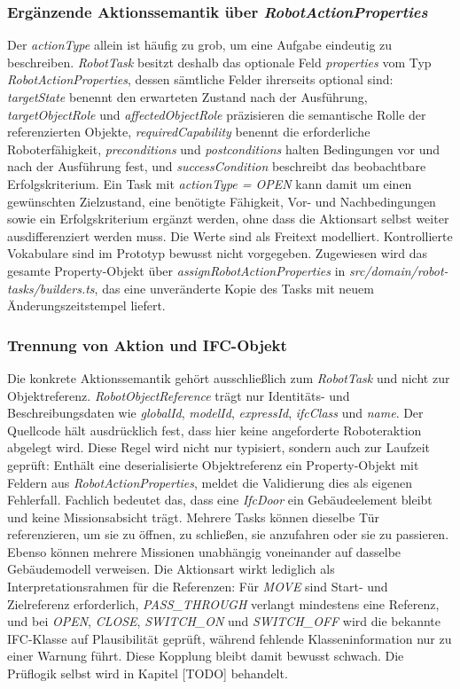 \subsubsection{Ergänzende Aktionssemantik über \textit{RobotActionProperties}}
Der \textit{actionType} allein ist häufig zu grob, um eine Aufgabe eindeutig zu beschreiben. \textit{RobotTask}
besitzt deshalb das optionale Feld \textit{properties} vom Typ \textit{RobotActionProperties}, dessen sämtliche
Felder ihrerseits optional sind: \textit{targetState} benennt den erwarteten Zustand nach der Ausführung,
\textit{targetObjectRole} und \textit{affectedObjectRole} präzisieren die semantische Rolle der referenzierten
Objekte, \textit{requiredCapability} benennt die erforderliche Roboterfähigkeit, \textit{preconditions} und
\textit{postconditions} halten Bedingungen vor und nach der Ausführung fest, und \textit{successCondition}
beschreibt das beobachtbare Erfolgskriterium. Ein Task mit \textit{actionType = OPEN} kann damit um einen
gewünschten Zielzustand, eine benötigte Fähigkeit, Vor- und Nachbedingungen sowie ein
Erfolgskriterium ergänzt werden, ohne dass die Aktionsart selbst weiter ausdifferenziert werden
muss. Die Werte sind als Freitext modelliert. Kontrollierte Vokabulare sind im Prototyp bewusst
nicht vorgegeben. Zugewiesen wird das gesamte Property-Objekt über \textit{assignRobotActionProperties} in
\textit{src/domain/robot-tasks/builders.ts}, das eine unveränderte Kopie des Tasks mit neuem
Änderungszeitstempel liefert.
\subsubsection{Trennung von Aktion und IFC-Objekt}
Die konkrete Aktionssemantik gehört ausschließlich zum \textit{RobotTask} und nicht zur Objektreferenz.
\textit{RobotObjectReference} trägt nur Identitäts- und Beschreibungsdaten wie \textit{globalId}, \textit{modelId},
\textit{expressId}, \textit{ifcClass} und \textit{name}. Der Quellcode hält ausdrücklich fest, dass hier keine
angeforderte Roboteraktion abgelegt wird. Diese Regel wird nicht nur typisiert, sondern auch zur
Laufzeit geprüft: Enthält eine deserialisierte Objektreferenz ein Property-Objekt mit Feldern aus
\textit{RobotActionProperties}, meldet die Validierung dies als eigenen Fehlerfall. Fachlich bedeutet das,
dass eine \textit{IfcDoor} ein Gebäudeelement bleibt und keine Missionsabsicht trägt. Mehrere Tasks können
dieselbe Tür referenzieren, um sie zu öffnen, zu schließen, sie anzufahren oder sie zu passieren.
Ebenso können mehrere Missionen unabhängig voneinander auf dasselbe Gebäudemodell verweisen. Die
Aktionsart wirkt lediglich als Interpretationsrahmen für die Referenzen: Für \textit{MOVE} sind Start- und
Zielreferenz erforderlich, \textit{PASS\_THROUGH} verlangt mindestens eine Referenz, und bei \textit{OPEN},
\textit{CLOSE}, \textit{SWITCH\_ON} und \textit{SWITCH\_OFF} wird die bekannte IFC-Klasse auf Plausibilität geprüft,
während fehlende Klasseninformation nur zu einer Warnung führt. Diese Kopplung bleibt damit bewusst
schwach.  Die Prüflogik selbst wird in Kapitel [TODO] behandelt.
